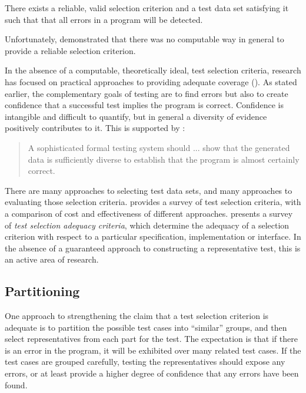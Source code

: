 \begin{theorem}
There exists a reliable, valid selection criterion and a test data set satisfying it 
such that that all errors in a program will be detected.
\end{theorem}

\noindent
Unfortunately, \cite{Howden1976} demonstrated that
there was no computable way in general to provide a reliable selection criterion.

In the absence of a computable, theoretically ideal, test selection criteria,
research has focused on practical approaches to providing adequate coverage
(\cite{ZhuHallMay1997}).
As stated earlier, the complementary goals of testing are to find errors
but also to create confidence that a successful test implies the program is correct.
Confidence is intangible and difficult to quantify,
but in general a diversity of evidence positively contributes to it.
This is supported by  \cite{Cartwright1981}:

\begin{quote}
A sophisticated formal testing system should ... 
show that the generated data is sufficiently diverse to 
establish that the program is almost certainly correct.
\end{quote}

There are many approaches to selecting test data sets,
and many approaches to evaluating those selection criteria.
\cite{WeyukerEtal1991} provides a survey of test selection criteria,
with a comparison of cost and effectiveness of different approaches.
\cite{ZhuHallMay1997} presents a survey of 
\emph{test selection adequacy criteria},
which determine the adequacy of a selection criterion 
with respect to a particular specification, implementation or interface.
In the absence of a guaranteed approach to constructing a representative test,
this is an active area of research.

\subsection{Partitioning}
One approach to strengthening the claim that 
a test selection criterion is adequate
is to partition the possible test cases into ``similar'' groups,
and then select representatives from each part for the test.
The expectation is that if there is an error in the program,
it will be exhibited over many related test cases.
If the test cases are grouped carefully,
testing the representatives should expose any errors,
or at least provide a higher degree of confidence that any errors have been found.

